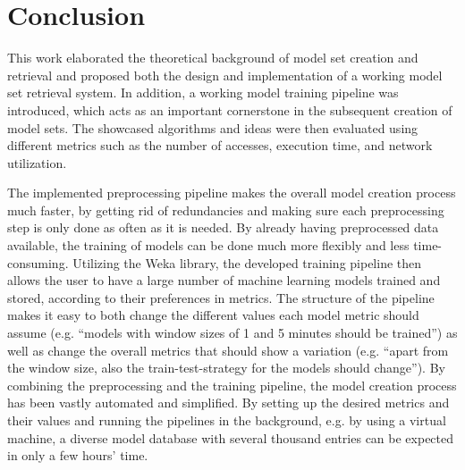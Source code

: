 \section{Conclusion}

This work elaborated the theoretical background of model set creation and retrieval and proposed both the design and implementation of a working model set retrieval system. In addition, a working model training pipeline was introduced, which acts as an important cornerstone in the subsequent creation of model sets. The showcased algorithms and ideas were then evaluated using different metrics such as the number of accesses, execution time, and network utilization.

The implemented preprocessing pipeline makes the overall model creation process much faster, by getting rid of redundancies and making sure each preprocessing step is only done as often as it is needed. By already having preprocessed data available, the training of models can be done much more flexibly and less time-consuming. Utilizing the Weka library, the developed training pipeline then allows the user to have a large number of machine learning models trained and stored, according to their preferences in metrics. The structure of the pipeline makes it easy to both change the different values each model metric should assume (e.g. “models with window sizes of 1 and 5 minutes should be trained”) as well as change the overall metrics that should show a variation (e.g. “apart from the window size, also the train-test-strategy for the models should change”). By combining the preprocessing and the training pipeline, the model creation process has been vastly automated and simplified. By setting up the desired metrics and their values and running the pipelines in the background, e.g. by using a virtual machine, a diverse model database with several thousand entries can be expected in only a few hours’ time.

